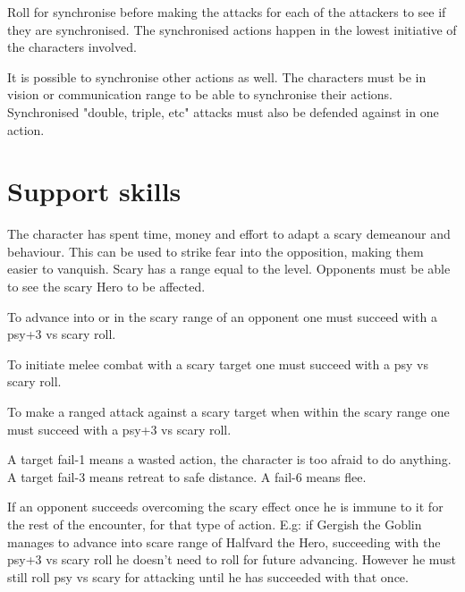 Roll for synchronise before making the attacks for each of the attackers to see if they are synchronised. The synchronised actions happen in the lowest initiative of the characters involved.

It is possible to synchronise other actions as well. The characters must be in vision or communication range to be able to synchronise their actions.
Synchronised "double, triple, etc" attacks must also be defended against in one action.


\closeskillslist


















\section*{Support skills}

\openskillslist


 The character has spent time, money and effort to adapt a scary demeanour and behaviour. This can be used to strike fear into the opposition, making them easier to vanquish. Scary has a range equal to the level. Opponents must be able to see the scary Hero to be affected.

To advance into or in the scary range of an opponent one must succeed with a psy+3 vs scary roll.

To initiate melee combat with a scary target one must succeed with a psy vs scary roll.

To make a ranged attack against a scary target when within the scary range one must succeed with a psy+3 vs scary roll.

A target fail-1 means a wasted action, the character is too afraid to do anything. A target fail-3 means retreat to safe distance. A fail-6 means flee.

If an opponent succeeds overcoming the scary effect once he is immune to it for the rest of the encounter, for that type of action. E.g: if Gergish the Goblin manages to advance into scare range of Halfvard the Hero, succeeding with the psy+3 vs scary roll he doesn't need to roll for future advancing. However he must still roll psy vs scary for attacking until he has succeeded with that once.


